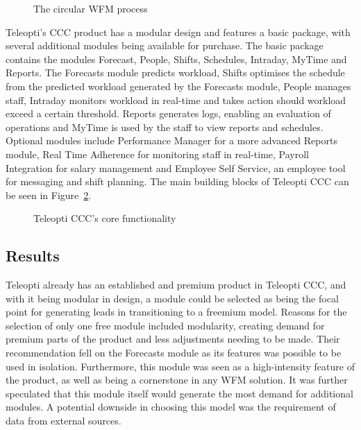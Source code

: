 \begin{figure}[H]
    \centering
    \caption{The circular WFM process}
    \label{fig:wfm}
\end{figure}

Teleopti's CCC product has a modular design and features a basic package, with several additional modules being available for purchase. The basic package contains the modules Forecast, People, Shifts, Schedules, Intraday, MyTime and Reports. The Forecasts module predicts workload, Shifts optimises the schedule from the predicted workload generated by the Forecasts module, People manages staff, Intraday monitors workload in real-time and takes action should workload exceed a certain threshold. Reports generates logs, enabling an evaluation of operations and MyTime is used by the staff to view reports and schedules. Optional modules include Performance Manager for a more advanced Reports module, Real Time Adherence for monitoring staff in real-time, Payroll Integration for salary management and Employee Self Service, an employee tool for messaging and shift planning. The main building blocks of Teleopti CCC can be seen in Figure~\ref{fig:teleopticcc}.

\begin{figure}[H]
    \centering
    \caption{Teleopti CCC's core functionality~\cite{teleopti2016}}
    \label{fig:teleopticcc}
\end{figure}

\subsection{Results}
Teleopti already has an established and premium product in Teleopti CCC, and with it being modular in design, a module could be selected as being the focal point for generating leads in transitioning to a freemium model. Reasons for the selection of only one free module included modularity, creating demand for premium parts of the product and less adjustments needing to be made. Their recommendation fell on the Forecasts module as its features was possible to be used in isolation. Furthermore, this module was seen as a high-intensity feature of the product, as well as being a cornerstone in any WFM solution. It was further speculated that this module itself would generate the most demand for additional modules. A potential downside in choosing this model was the requirement of data from external sources.


